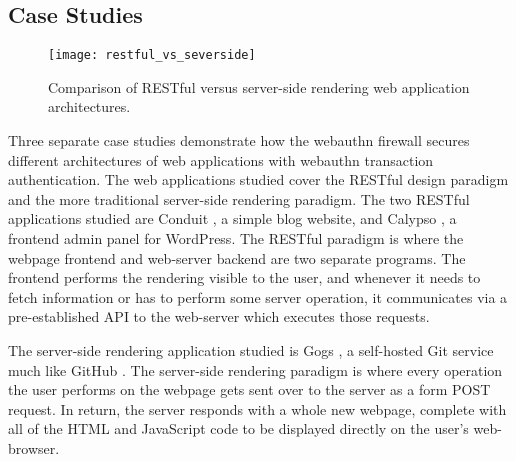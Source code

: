 
\subsection{Case Studies}

\begin{figure}[h]
  \centering
  \texttt{[image: restful\_vs\_severside]}
  \caption{Comparison of RESTful versus server-side rendering web application architectures.}
\end{figure}

Three separate case studies demonstrate how the webauthn firewall secures different architectures of web applications with webauthn transaction authentication. The web applications studied cover the RESTful design paradigm and the more traditional server-side rendering paradigm. The two RESTful applications studied are Conduit \cite{TODO-conduit}, a simple blog website, and Calypso \cite{TODO-calypso}, a frontend admin panel for WordPress. The RESTful paradigm is where the webpage frontend and web-server backend are two separate programs. The frontend performs the rendering visible to the user, and whenever it needs to fetch information or has to perform some server operation, it communicates via a pre-established API to the web-server which executes those requests. 

The server-side rendering application studied is Gogs \cite{TODO-gogs}, a self-hosted Git service much like GitHub \cite{TODO-github?}. The server-side rendering paradigm is where every operation the user performs on the webpage gets sent over to the server as a form POST request. In return, the server responds with a whole new webpage, complete with all of the HTML and JavaScript code to be displayed directly on the user's web-browser.

